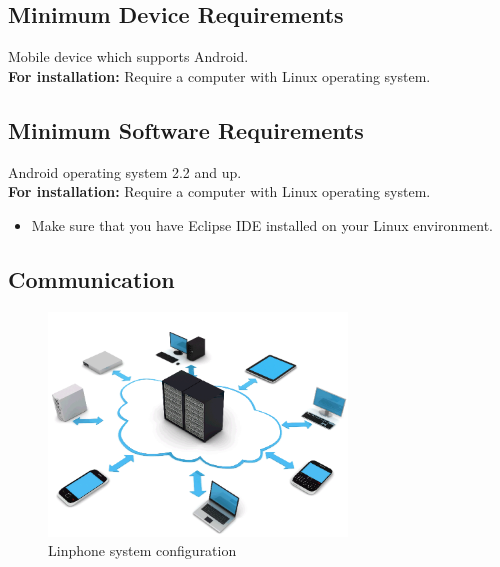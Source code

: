 \documentclass[11pt]{article}
\begin{document}
\subsection{Minimum Device Requirements}
Mobile device which supports Android.\\
\textbf{For installation:} Require a computer with Linux operating system.
\subsection{Minimum Software Requirements}
Android operating system 2.2 and up.\\
\textbf{For installation:} Require a computer with Linux operating system. 
\begin{itemize}
\item Make sure that you have Eclipse IDE installed on your Linux environment.
\end{itemize}

\subsection{Communication}
\begin{figure}[H]
\includegraphics[width=300px]{./images/network.png}
\caption{Linphone system configuration}
\label{Configuration}
\end{figure}
\end{document}
